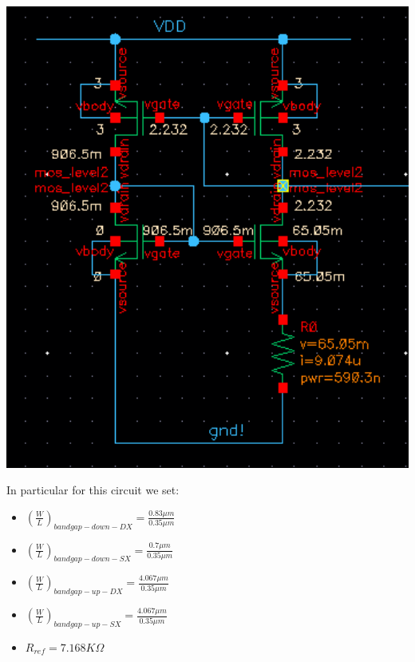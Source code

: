 \centering
\includegraphics[width=1\textwidth]{Capitoli/bg.png}
\raggedright


In particular for this circuit we set:

\begin{itemize}

	\item $ (\frac{W}{L})_{bandgap-down-DX} = \frac{0.83\mu m}{0.35 \mu m}$
	
	\item $(\frac{W}{L})_{bandgap-down-SX}= \frac{0.7 \mu m}{0.35 \mu m}$
	
	\item $(\frac{W}{L})_{bandgap-up-DX}= \frac{4.067 \mu m}{0.35 \mu m}$
	
	\item $(\frac{W}{L})_{bandgap-up-SX}= \frac{4.067 \mu m}{0.35 \mu m}$

	\item $R_{ref} = 7.168 K \Omega$

\end{itemize}


